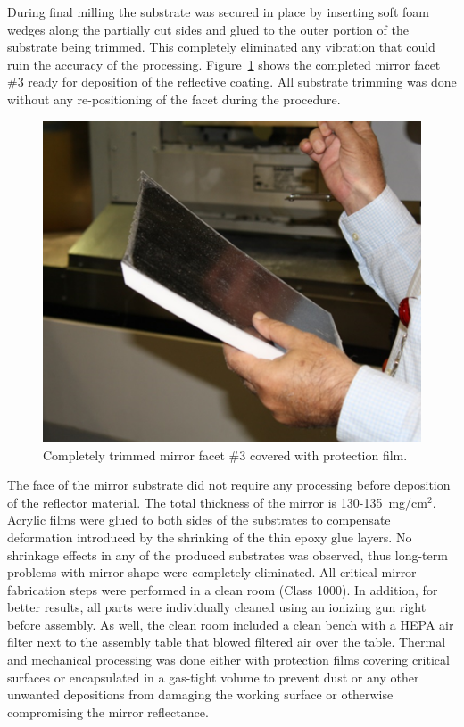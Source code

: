 During final milling the substrate was secured in place by inserting soft foam wedges along the partially cut sides
and glued to the outer portion of the substrate being trimmed. This completely eliminated any vibration that could
ruin the accuracy of the processing. Figure~\ref{fig:Trimmed} shows the completed mirror facet \#3 ready for
deposition of the reflective coating. All substrate trimming was done without any re-positioning of the facet during
the procedure. 

\begin{figure}[ht]
    \centering
    \includegraphics[width=1.0\linewidth]{images/Trimmed}
    \caption{Completely trimmed mirror facet \#3 covered with protection film. }
    \label{fig:Trimmed}
\end{figure}

The face of the mirror substrate did not require any processing before deposition of the reflector material. The
total thickness of the mirror is 130-135~mg/cm$^2$. Acrylic films were glued to both sides of the substrates to
compensate deformation introduced by the shrinking of the thin epoxy glue layers. No shrinkage effects in any of
the produced substrates was observed, thus long-term problems with mirror shape were completely eliminated.
All critical mirror fabrication steps were performed in a clean room (Class 1000). In addition, for better results,
all parts were individually cleaned using an ionizing gun right before assembly. As well, the clean room included a
clean bench with a HEPA air filter next to the assembly table that blowed filtered air over the table. Thermal and
mechanical processing was done either with protection films covering critical surfaces or encapsulated in a gas-tight
volume to prevent dust or any other unwanted depositions from damaging the working surface or otherwise
compromising the mirror reflectance.

